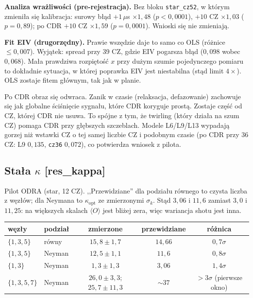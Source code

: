 \documentclass[11pt,a4paper]{article}
\newcommand{\slid}[1]{\hfill{\normalfont\small\ttfamily\color{axbluedk}[#1]}}
\newcommand{\ev}[1]{\langle #1\rangle}
\begin{document}
\textbf{Analiza wrażliwości (pre-rejestracja).} Bez bloku \texttt{star\_cz52}, w którym zmieniła
się kalibracja: surowy błąd $+1\,\mu$s $\times1{,}48$ ($p<0{,}0001$), $+10$ CZ $\times1{,}03$
($p=0{,}89$); po CDR $+10$ CZ $\times1{,}59$ ($p=0{,}0001$). Wnioski się nie zmieniają.

\textbf{Fit EIV (drugorzędny).} Prawie wszędzie daje to samo co OLS (różnice $\le0{,}007$). Wyjątek:
spread przy 39 CZ, gdzie EIV pogarsza błąd ($0{,}098$ wobec $0{,}068$). Mała prawdziwa rozpiętość $x$
przy dużym szumie pojedynczego pomiaru to dokładnie sytuacja, w której poprawka EIV jest niestabilna
(stąd limit $4\times$). OLS zostaje fitem głównym, tak jak w planie.

Po CDR obraz się odwraca. Zanik w czasie (relaksacja, defazowanie) zachowuje się jak globalne
ściśnięcie sygnału, które CDR koryguje prostą. Zostaje część od CZ, której CDR nie usuwa. To spójne z
tym, że twirling (który działa na szum CZ) pomaga CDR przy głębszych szczeblach. Modele L6/L9/L13
wypadają gorzej niż wstawki CZ o tej samej liczbie CZ i podobnym czasie (po CDR przy 36 CZ: L9
$0{,}135$, \texttt{cz36} $0{,}072$), co potwierdza wniosek z pilota.

\subsection{Stała $\kappa$ \slid{res\_kappa}}

Pilot ODRA (star, 12 CZ). ,,Przewidziane'' dla podziału równego to czysta liczba z węzłów; dla
Neymana to $\kappa_{\text{opt}}$ ze zmierzonymi $\sigma_k$. Stąd $3{,}06$ i $11{,}6$ zamiast $3{,}0$
i $11{,}25$: na większych skalach $\ev O$ jest bliżej zera, więc wariancja shotu jest inna.

\begin{center}
\begin{tabular}{@{}llccc@{}}
\toprule
węzły & podział & zmierzone & przewidziane & różnica \\
\midrule
$\{1,3,5\}$ & równy & $15{,}8\pm1{,}7$ & $14{,}66$ & $0{,}7\sigma$ \\
$\{1,3,5\}$ & Neyman & $12{,}5\pm1{,}1$ & $11{,}6$ & $0{,}8\sigma$ \\
$\{1,3\}$ & Neyman & $1{,}3\pm1{,}3$ & $3{,}06$ & $1{,}4\sigma$ \\
$\{1,3,5,7\}$ & Neyman & $26{,}0\pm3{,}3$; $25{,}7\pm11{,}3$ & $\sim37$ & $>3\sigma$ (pierwsze okno) \\
\bottomrule
\end{tabular}
\end{center}
\end{document}
